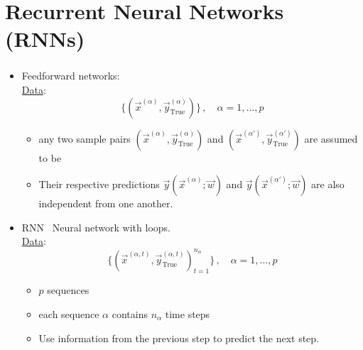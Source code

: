 \section{Recurrent Neural Networks (RNNs)}

\begin{frame}\frametitle{\subsecname}

\begin{itemize}
\item Feedforward networks:\\

\underline{Data}:
\begin{equation*}
\Big\{ \left(\vec x^{(\alpha)}, \vec y^{(\alpha)}_{\mathrm{True}} \right) \Big\}\,,\quad \alpha = 1,\ldots,p
\end{equation*}

\pause

\begin{itemize}
\item any two sample pairs $\left(\vec x^{(\alpha)}, \vec y^{(\alpha)}_{\mathrm{True}} \right)$ and $\left(\vec x^{(\alpha')}, \vec y^{(\alpha')}_{\mathrm{True}} \right)$ are assumed to be \iid
\item Their respective predictions $\vec y(\vec x^{(\alpha)}; \vec w)$ and $\vec y(\vec x^{(\alpha')}; \vec w)$ are also independent from one another.
\end{itemize}

\pause

\item RNN \corresponds~Neural network with loops.\\

\underline{Data}:\\

\begin{equation*}
\Big\{ \left(\vec x^{(\alpha,t)}, \vec y^{(\alpha,t)}_{\mathrm{True}} \right)_{t=1}^{n_{\alpha}} \Big\}\,,\quad \alpha = 1,\ldots,p
\end{equation*}

\pause

\begin{itemize}
\item $p$ \iid sequences
\item each sequence $\alpha$ contains $n_{\alpha}$ time steps
\item Use information from the previous step to predict the next step.
\end{itemize}

\end{itemize}

\end{frame}


